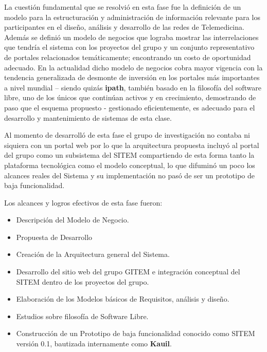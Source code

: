 La cuestión fundamental que se resolvió en esta fase fue la definición de un modelo para la estructuración y administración de información relevante para los participantes en el diseño, análisis y desarrollo de las redes de Telemedicina. Además se definió un modelo de negocios que lograba mostrar las interrelaciones que tendría el sistema con los proyectos del grupo y un conjunto representativo de portales relacionados temáticamente; encontrando un costo de oportunidad adecuado. En la actualidad dicho modelo de negocios cobra mayor vigencia con la tendencia generalizada de desmonte de inversión en los portales más importantes a nivel mundial – siendo quizás \textbf{ipath}, también basado en la filosofía del software libre, uno de los únicos que continúan activos y en crecimiento, demostrando de paso que el esquema propuesto - gestionado eficientemente, es adecuado para el desarrollo y mantenimiento de sistemas de esta clase.

Al momento de desarrolló de esta fase el grupo de investigación no contaba ni siquiera con un portal web por lo que la arquitectura propuesta incluyó al portal del grupo como un subsistema del SITEM compartiendo de esta forma tanto la plataforma tecnológica como el modelo conceptual, lo que difuminó un poco los alcances reales del Sistema y su implementación no pasó de ser un prototipo de baja funcionalidad. 

Los alcances y logros efectivos de esta fase fueron:

\begin{itemize}
\item Descripción del Modelo de Negocio.
\item Propuesta de Desarrollo
\item Creación de la Arquitectura general del Sistema.
\item Desarrollo del sitio web del grupo GITEM e integración conceptual del SITEM dentro de los proyectos del grupo.
\item Elaboración de los Modelos básicos de Requisitos, análisis y diseño.
\item Estudios sobre filosofía de Software Libre.
\item Construcción de un Prototipo de baja funcionalidad conocido como SITEM versión 0.1, bautizada internamente como \textbf{Kauil}.
\end{itemize}


